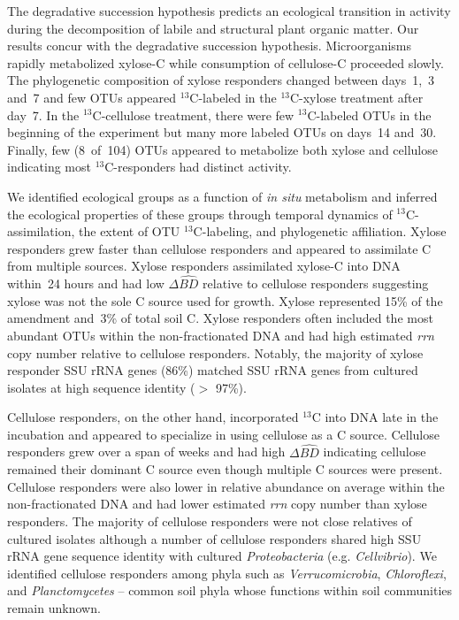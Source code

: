 The degradative succession hypothesis predicts an ecological transition in
activity during the decomposition of labile and structural plant organic
matter. Our results concur with the degradative succession hypothesis.
Microorganisms rapidly metabolized xylose-C while consumption of cellulose-C proceeded
slowly. The phylogenetic composition of xylose
responders changed between days~1,~3 and~7 and few OTUs appeared
$^{13}$C-labeled in the $^{13}$C-xylose treatment after day~7. In the
$^{13}$C-cellulose treatment, there were few $^{13}$C-labeled OTUs in the
beginning of the experiment but many more labeled OTUs on days~14 and~30.
Finally, few (8~of~104) OTUs appeared to metabolize both xylose and cellulose
indicating most $^{13}$C-responders had distinct activity.

We identified ecological groups as a function of \textit{in situ} metabolism
and inferred the ecological properties of these groups through temporal
dynamics of $^{13}$C-assimilation, the extent of OTU $^{13}$C-labeling, and
phylogenetic affiliation.  Xylose responders grew faster than cellulose
responders and appeared to assimilate C from multiple sources. Xylose
responders assimilated xylose-C into DNA within~24 hours and had low
$\Delta\hat{BD}$ relative to cellulose responders suggesting xylose was not the
sole C source used for growth. Xylose represented 15\% of the amendment and~3\%
of total soil C. Xylose responders often included the most abundant OTUs within
the non-fractionated DNA and had high estimated \textit{rrn} copy number
relative to cellulose responders.  Notably, the majority of xylose responder
SSU rRNA genes (86\%) matched SSU rRNA genes from cultured isolates at high
sequence identity ($>$ 97\%). 

Cellulose responders, on the other hand, incorporated $^{13}$C into DNA late in 
the incubation and appeared to specialize in using cellulose as a C source.
Cellulose responders grew over a span of weeks and had high $\Delta\hat{BD}$
indicating cellulose remained their dominant C source even though multiple
C sources were present. Cellulose responders were also lower in
relative abundance on average within the non-fractionated DNA and had lower
estimated \textit{rrn} copy number than xylose responders. The majority of
cellulose responders were not close relatives of cultured isolates although
a number of cellulose responders shared high SSU rRNA gene sequence identity
with cultured \textit{Proteobacteria} (e.g. \textit{Cellvibrio}). We
identified cellulose responders among phyla such as \textit{Verrucomicrobia},
\textit{Chloroflexi}, and \textit{Planctomycetes} -- common soil phyla whose
functions within soil communities remain unknown.


